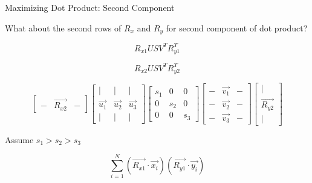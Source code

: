 \documentclass{beamer}
\begin{document}
\begin{frame}{Maximizing Dot Product: Second Component}

What about the second rows of $R_x$ and $R_y$ for second component of dot product?

\[ R_{x1} U S V^T R_{y1}^T \]

\[ R_{x2} U S V^T R_{y2}^T \]

\small
\[ \left[ \begin{array}{ccc} - & \vec{R_{x2}} & - \end{array} \right] \left[ \begin{array}{ccc} | & | & | \\ \vec{u_1} & \vec{u_2} & \vec{u_3} \\ | & | & | \end{array} \right]  \left[ \begin{array}{ccc} s_1 & 0 & 0 \\ 0 & s_2 & 0 \\ 0 & 0 & s_3 \end{array} \right] \left[ \begin{array}{ccc} - & \vec{v_1} & - \\ - & \vec{v_2} & - \\ - & \vec{v_3} & - \end{array} \right] \left[ \begin{array}{c} | \\ \vec{R_{y2}} \\ | \end{array} \right] \]

Assume $s_1 > s_2 > s_3$



\[ \sum_{i=1}^N  (\vec{R_{x1}} \cdot \vec{x_i})(\vec{R_{y1}} \cdot \vec{y_i}) \]

\end{frame}
\end{document}
